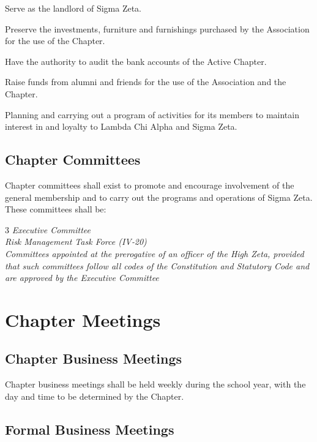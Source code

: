 \documentclass{article}
\begin{document}
\begin{subsubsectionList}
  \item Serve as the landlord of Sigma Zeta.
  \item Preserve the investments, furniture and furnishings purchased by the
  Association for the use of the Chapter.
  \item Have the authority to audit the bank accounts of the Active Chapter.
  \item Raise funds from alumni and friends for the use of the Association and
  the Chapter.
  \item Planning and carrying out a program of activities for its members to
  maintain interest in and loyalty to Lambda Chi Alpha and Sigma Zeta.
\end{subsubsectionList}

\subsection{Chapter Committees}

Chapter committees shall exist to promote and encourage involvement of the
general membership and to carry out the programs and operations of Sigma Zeta.
These committees shall be:
\vspace*{-\parskip}
\begin{adjustwidth}{3}{}
\itshape%
Executive Committee\\
Risk Management Task Force (IV‑20)\\
Committees appointed at the prerogative of an officer of the High Zeta, provided
that such committees follow all codes of the \emph{Constitution} and
\emph{Statutory Code} and are approved by the Executive Committee
\end{adjustwidth}

\pagebreak

\section{Chapter Meetings}

\subsection{Chapter Business Meetings}

Chapter business meetings shall be held weekly during the school year, with the
day and time to be determined by the Chapter.

\subsection{Formal Business Meetings}
\end{document}
